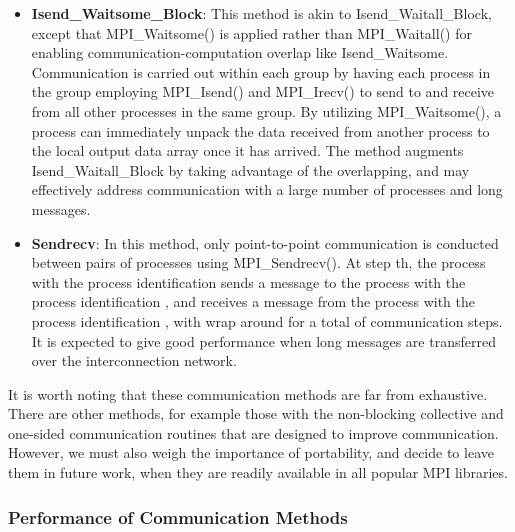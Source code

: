 \begin{itemize}
\item
\textbf{Isend\_Waitsome\_Block}: This method is akin to Isend\_Waitall\_Block, except that MPI\_Waitsome() is applied rather than MPI\_Waitall() for enabling communication-computation overlap like Isend\_Waitsome. Communication is carried out within each group by having each process in the group employing MPI\_Isend() and MPI\_Irecv() to send to and receive from all other processes in the same group. By utilizing MPI\_Waitsome(), a process can immediately unpack the data received from another process to the local output data array once it has arrived. The method augments Isend\_Waitall\_Block by taking advantage of the overlapping, and may effectively address communication with a large number of processes and long messages. 
\item
\textbf{Sendrecv}: In this method, only point-to-point communication is conducted between pairs of processes using MPI\_Sendrecv(). At step th, the process with the process identification  sends a message to the process with the process identification , and receives
a message from the process with the process identification , with wrap around for a total of  communication steps. It is expected to give good performance when long messages are transferred over the interconnection network.  
\end{itemize}

It is worth noting that these communication methods are far from exhaustive. There are other methods, for example those with the non-blocking collective and one-sided communication routines that are designed to improve communication. However, we must also weigh the importance of portability, and decide to leave them in future work, when they are readily available in all popular MPI libraries.   

\subsubsection{Performance of Communication Methods}
\label{sec-per-comm}

